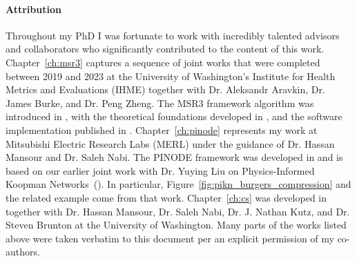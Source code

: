\paragraph{Attribution} Throughout my PhD I was fortunate to work with incredibly talented advisors and collaborators who significantly contributed to the content of this work. Chapter~\ref{ch:msr3} captures a sequence of joint works that were completed between 2019 and 2023 at the University of Washington's Institute for Health Metrics and Evaluations (IHME) together with Dr. Aleksandr Aravkin, Dr. James Burke, and Dr. Peng Zheng. The MSR3 framework algorithm was introduced in \cite{sholokhov2022relaxation}, with the theoretical foundations developed in \cite{aravkin2022jimtheory}, and the software implementation published in \cite{sholokhov2023pysr3}. Chapter~\ref{ch:pinode} represents my work at Mitsubishi Electric Research Labs (MERL) under the guidance of Dr. Hassan Mansour and Dr. Saleh Nabi. The PINODE framework was developed in \cite{sholokhov2023pinode} and is based on our earlier joint work with Dr. Yuying Liu on Physics-Informed Koopman Networks~(\cite{liu2022physics}). In particular, Figure~\ref{fig:pikn_burgers_compression} and the related example come from that work. Chapter~\ref{ch:cs} was developed in~\cite{sholokhov2023cs} together with Dr. Hassan Mansour, Dr. Saleh Nabi, Dr. J. Nathan Kutz, and Dr. Steven Brunton at the University of Washington. Many parts of the works listed above were taken verbatim to this document per an explicit permission of my co-authors.